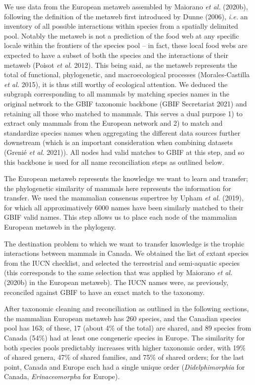 \documentclass[10pt,oneside]{article}
\begin{document}
We use data from the European metaweb assembled by Maiorano \emph{et
al.} (2020b), following the definition of the metaweb first introduced
by Dunne (2006), \emph{i.e.} an inventory of all possible interactions
within species from a spatially delimited pool. Notably the metaweb is
not a prediction of the food web at any specific locale within the
frontiers of the species pool -- in fact, these local food webs are
expected to have a subset of both the species and the interactions of
their metaweb (Poisot \emph{et al.} 2012). This being said, as the
metaweb represents the total of functional, phylogenetic, and
macroecological processes (Morales-Castilla \emph{et al.} 2015), it is
thus still worthy of ecological attention. We deduced the subgraph
corresponding to all mammals by matching species names in the original
network to the GBIF taxonomic backbone (GBIF Secretariat 2021) and
retaining all those who matched to mammals. This serves a dual purpose
1) to extract only mammals from the European network and 2) to match and
standardize species names when aggregating the different data sources
further downstream (which is an important consideration when combining
datasets (Grenié \emph{et al.} 2021)). All nodes had valid matches to
GBIF at this step, and so this backbone is used for all name
reconciliation steps as outlined below.

The European metaweb represents the knowledge we want to learn and
transfer; the phylogenetic similarity of mammals here represents the
information for transfer. We used the mammalian consensus supertree by
Upham \emph{et al.} (2019), for which all approximatively 6000 names
have been similarly matched to their GBIF valid names. This step allows
us to place each node of the mammalian European metaweb in the
phylogeny.

The destination problem to which we want to transfer knowledge is the
trophic interactions between mammals in Canada. We obtained the list of
extant species from the IUCN checklist, and selected the terrestrial and
semi-aquatic species (this corresponds to the same selection that was
applied by Maiorano \emph{et al.} (2020b) in the European metaweb). The
IUCN names were, as previously, reconciled against GBIF to have an exact
match to the taxonomy.

After taxonomic cleaning and reconciliation as outlined in the following
sections, the mammalian European metaweb has 260 species, and the
Canadian species pool has 163; of these, 17 (about 4\% of the total) are
shared, and 89 species from Canada (54\%) had at least one congeneric
species in Europe. The similarity for both species pools predictably
increases with higher taxonomic order, with 19\% of shared genera, 47\%
of shared families, and 75\% of shared orders; for the last point,
Canada and Europe each had a single unique order (\emph{Didelphimorphia}
for Canada, \emph{Erinaceomorpha} for Europe).
\end{document}
